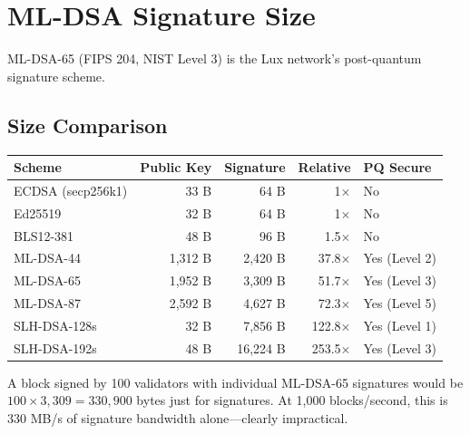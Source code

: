 \section{ML-DSA Signature Size}


ML-DSA-65 (FIPS 204, NIST Level 3) is the Lux network's post-quantum signature scheme.

\subsection{Size Comparison}

\begin{center}
\begin{tabular}{lrrrl}
\toprule
\textbf{Scheme} & \textbf{Public Key} & \textbf{Signature} & \textbf{Relative} & \textbf{PQ Secure} \\
\midrule
ECDSA (secp256k1) & 33 B & 64 B & 1$\times$ & No \\
Ed25519 & 32 B & 64 B & 1$\times$ & No \\
BLS12-381 & 48 B & 96 B & 1.5$\times$ & No \\
ML-DSA-44 & 1,312 B & 2,420 B & 37.8$\times$ & Yes (Level 2) \\
ML-DSA-65 & 1,952 B & 3,309 B & 51.7$\times$ & Yes (Level 3) \\
ML-DSA-87 & 2,592 B & 4,627 B & 72.3$\times$ & Yes (Level 5) \\
SLH-DSA-128s & 32 B & 7,856 B & 122.8$\times$ & Yes (Level 1) \\
SLH-DSA-192s & 48 B & 16,224 B & 253.5$\times$ & Yes (Level 3) \\
\bottomrule
\end{tabular}
\end{center}

A block signed by 100 validators with individual ML-DSA-65 signatures would be $100 \times 3{,}309 = 330{,}900$ bytes just for signatures. At 1,000 blocks/second, this is 330 MB/s of signature bandwidth alone---clearly impractical.

